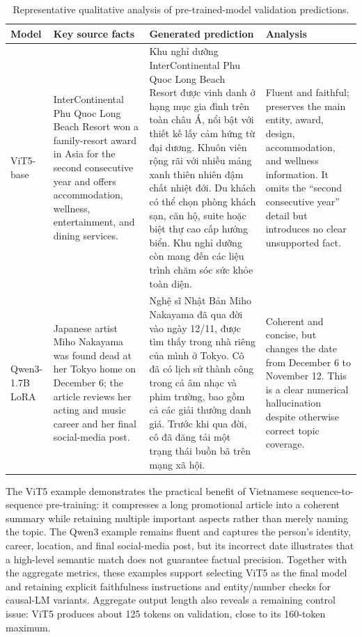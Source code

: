 \documentclass[conference]{IEEEtran}
\begin{document}
\begin{table}[htbp]
\centering
\caption{Representative qualitative analysis of pre-trained-model validation predictions.}
\label{tab:qualitative_pretrained}
\begin{tabular}{p{}p{}p{}p{}}
\toprule
Model & Key source facts & Generated prediction & Analysis \\
\midrule
ViT5-base &
InterContinental Phu Quoc Long Beach Resort won a family-resort award in Asia for the second consecutive year and offers accommodation, wellness, entertainment, and dining services. &
Khu nghỉ dưỡng InterContinental Phu Quoc Long Beach Resort được vinh danh ở hạng mục gia đình trên toàn châu Á, nổi bật với thiết kế lấy cảm hứng từ đại dương. Khuôn viên rộng rãi với nhiều mảng xanh thiên nhiên đậm chất nhiệt đới. Du khách có thể chọn phòng khách sạn, căn hộ, suite hoặc biệt thự cao cấp hướng biển. Khu nghỉ dưỡng còn mang đến các liệu trình chăm sóc sức khỏe toàn diện. &
Fluent and faithful; preserves the main entity, award, design, accommodation, and wellness information. It omits the ``second consecutive year'' detail but introduces no clear unsupported fact. \\
\midrule
Qwen3-1.7B LoRA &
Japanese artist Miho Nakayama was found dead at her Tokyo home on December 6; the article reviews her acting and music career and her final social-media post. &
Nghệ sĩ Nhật Bản Miho Nakayama đã qua đời vào ngày 12/11, được tìm thấy trong nhà riêng của mình ở Tokyo. Cô đã có lịch sử thành công trong cả âm nhạc và phim trường, bao gồm cả các giải thưởng danh giá. Trước khi qua đời, cô đã đăng tải một trạng thái buồn bã trên mạng xã hội. &
Coherent and concise, but changes the date from December 6 to November 12. This is a clear numerical hallucination despite otherwise correct topic coverage. \\
\bottomrule
\end{tabular}
\end{table}

The ViT5 example demonstrates the practical benefit of Vietnamese sequence-to-sequence pre-training: it compresses a long promotional article into a coherent summary while retaining multiple important aspects rather than merely naming the topic. The Qwen3 example remains fluent and captures the person's identity, career, location, and final social-media post, but its incorrect date illustrates that a high-level semantic match does not guarantee factual precision. Together with the aggregate metrics, these examples support selecting ViT5 as the final model and retaining explicit faithfulness instructions and entity/number checks for causal-LM variants. Aggregate output length also reveals a remaining control issue: ViT5 produces about 125 tokens on validation, close to its 160-token maximum.
\end{document}
